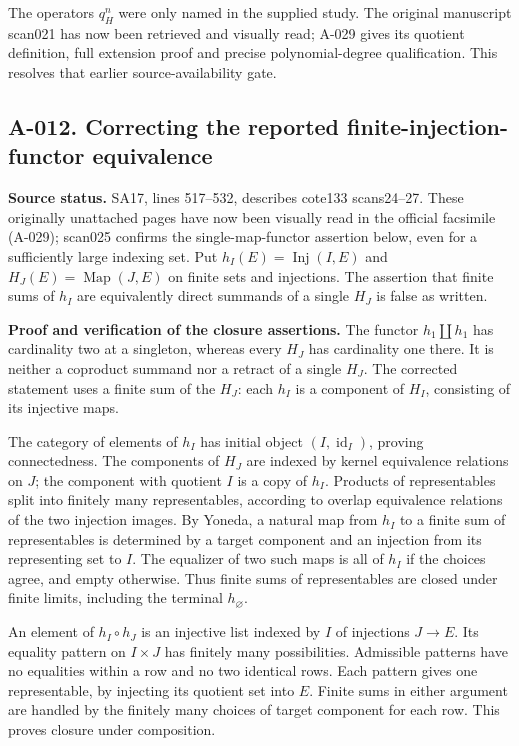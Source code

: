 The operators $q_H^n$ were only named in the supplied study.
The original manuscript scan021 has now been retrieved and visually
read; A-029 gives its quotient definition, full extension proof and
precise polynomial-degree qualification. This resolves that earlier
source-availability gate.

\subsection*{A-012. Correcting the reported finite-injection-functor equivalence}
\textbf{Source status.} SA17, lines 517--532, describes cote133
scans24--27. These originally unattached pages have now been
visually read in the official facsimile (A-029); scan025 confirms
the single-map-functor assertion below, even for a sufficiently
large indexing set. Put
$h_I(E)=\operatorname{Inj}(I,E)$ and $H_J(E)=\operatorname{Map}(J,E)$
on finite sets and injections. The assertion that finite sums of
$h_I$ are equivalently direct summands of a single $H_J$ is false
as written.

\textbf{Proof and verification of the closure assertions.}
The functor $h_1\amalg h_1$ has cardinality two at a singleton,
whereas every $H_J$ has cardinality one there. It is neither a
coproduct summand nor a retract of a single $H_J$. The corrected
statement uses a finite sum of the $H_J$: each $h_I$ is a component
of $H_I$, consisting of its injective maps.

The category of elements of $h_I$ has initial object
$(I,\operatorname{id}_I)$, proving connectedness. The components
of $H_J$ are indexed by kernel equivalence relations on $J$; the
component with quotient $I$ is a copy of $h_I$. Products of
representables split into finitely many representables, according
to overlap equivalence relations of the two injection images.
By Yoneda, a natural map from $h_I$ to a finite sum of representables
is determined by a target component and an injection from its
representing set to $I$. The equalizer of two such maps is all
of $h_I$ if the choices agree, and empty otherwise. Thus finite
sums of representables are closed under finite limits, including
the terminal $h_\varnothing$.

An element of $h_I\circ h_J$ is an injective list indexed by $I$
of injections $J\to E$. Its equality pattern on $I\times J$ has
finitely many possibilities. Admissible patterns have no equalities
within a row and no two identical rows. Each pattern gives one
representable, by injecting its quotient set into $E$. Finite sums
in either argument are handled by the finitely many choices of
target component for each row. This proves closure under composition.

